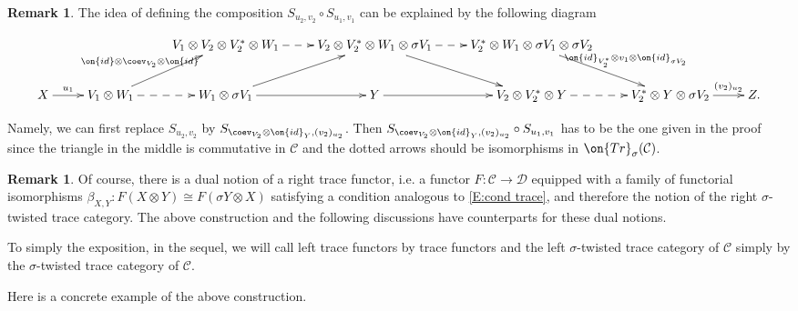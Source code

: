 \documentclass[11pt]{amsart}
\theoremstyle{definition}
\theoremstyle{definition}
\newtheorem{rmk}[thm]{Remark}
\theoremstyle{definition}
\numberwithin{equation}{subsection}
\newcommand{\mC}{{\mathcal C}}
\newcommand{\mD}{{\mathcal D}}
\newcommand{\id}{{\on{id}}}
\newcommand{\Tr}{{\on{Tr}}}
\begin{document}
\begin{rmk}
The idea of defining the composition $S_{u_2,v_2}\circ S_{u_1,v_1}$ can be explained by the following diagram
\begin{tiny}
\begin{equation*}
\label{E: comp in tr}
\xymatrix{
                     &                                                                                          &V_1\otimes V_2\otimes V^*_2\otimes W_1\ar@{-->}[r]&V_2\otimes V_2^*\otimes W_1\otimes \sigma V_1\ar[dr]\ar@{-->}[r]& V_2^*\otimes W_1\otimes \sigma V_1\otimes \sigma V_2\ar^-{\id_{V^*_2}\otimes v_1\otimes\id_{\sigma V_2}}[dr] &                                                    &\\
 X\ar^-{u_1}[r]&V_1\otimes W_1\ar^-{\id\otimes\coev_{V_2}\otimes\id}[ur]\ar@{-->}[r]& W_1\otimes \sigma V_1\ar[ur]\ar[r]                      &                 Y\ar[r]                                                   & V_2\otimes V_2^*\otimes Y    \ar@{-->}[r]                              & V_2^*\otimes Y\otimes \sigma V_2 \ar^-{(v_2)_{u_2}}[r]& Z. \\                                            
}
\end{equation*}
\end{tiny}

Namely, we can first replace $S_{u_2,v_2}$ by $S_{\coev_{V_2}\otimes \id_Y,(v_2)_{u_2}}$. Then $S_{\coev_{V_2}\otimes \id_Y,(v_2)_{u_2}}\circ S_{u_1,v_1}$  has to be the one given in the proof since the triangle in the middle is commutative in $\mC$ and the dotted arrows should be isomorphisms in $\Tr_\sigma(\mC)$.
\end{rmk}

\begin{rmk}
Of course, there is a dual notion of a right trace functor, i.e. a functor $F:\mC\to \mD$ equipped with a family of functorial isomorphisms $\beta_{X,Y}: F(X\otimes Y)\cong F(\sigma Y\otimes X)$ satisfying a condition analogous to \eqref{E:cond trace}, and therefore the notion of the right $\sigma$-twisted trace category. The above construction and the following discussions have counterparts for these dual notions. 

To simply the exposition, in the sequel, we will call left trace functors by trace functors and the left $\sigma$-twisted trace category of $\mC$ simply by the $\sigma$-twisted trace category of $\mC$.
\end{rmk}

Here is a concrete example of the above construction. 
\end{document}
